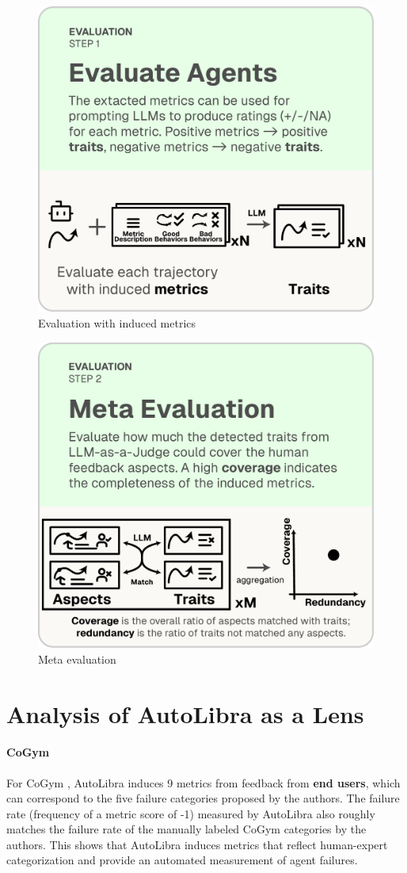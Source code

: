 \begin{figure}[!h]
	\includegraphics[width=0.4\linewidth]{figs/autolibra_step_3.pdf}
	\caption{Evaluation with induced metrics}
	\label{fig:llm_as_a_judge}
\end{figure}


\begin{figure}[!h]
	\includegraphics[width=0.4\linewidth]{figs/autolibra_step_4.pdf}
	\caption{Meta evaluation}
	\label{fig:meta_evaluation}
\end{figure}


\section{Analysis of AutoLibra as a Lens}
\label{sec:autolibra_as_a_lens_analysis}

\paragraph{CoGym}
For CoGym \citep{shao2024collaborative}, AutoLibra induces 9 metrics from
feedback from \textbf{end users}, which can correspond to the five failure
categories proposed by the authors. The failure rate (frequency of a metric
score of -1) measured by AutoLibra also roughly matches the failure rate of the
manually labeled CoGym categories by the authors. This shows that AutoLibra induces
metrics that reflect human-expert categorization and provide an automated measurement
of agent failures.



